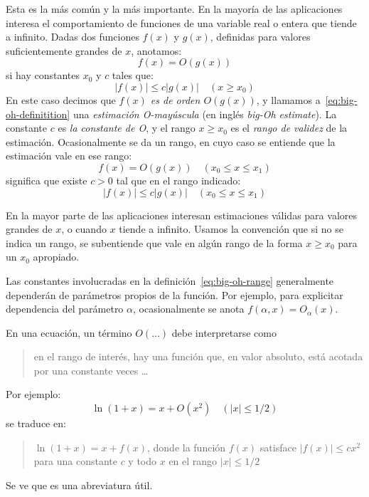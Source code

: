   Esta es la más común y la más importante.
  En la mayoría de las aplicaciones interesa
  el comportamiento de funciones de una variable real o entera
  que tiende a infinito.
  Dadas dos funciones \(f(x)\) y \(g(x)\),
  definidas para valores suficientemente grandes de \(x\),
  anotamos:
  \begin{equation}
    \label{eq:big-oh}
    f(x)
      = O(g(x))
  \end{equation}
  si hay constantes \(x_0\) y \(c\) tales que:
  \begin{equation}
    \label{eq:big-oh-definitition}
    \lvert f(x) \rvert
      \le c \lvert g(x) \rvert
      \quad (x \ge x_0)
  \end{equation}
  En este caso decimos que \emph{\(f(x)\) es de orden \(O(g(x))\)},
  y llamamos a~\eqref{eq:big-oh-definitition}
  una \emph{estimación O-mayúscula}
  (en inglés \emph{\foreignlanguage{english}{big-Oh estimate}}).
  La constante \(c\) es \emph{la constante de O},
  y el rango \(x \ge x_0\) es el \emph{rango de validez} de la estimación.
  Ocasionalmente se da un rango,
  en cuyo caso se entiende que la estimación vale en ese rango:
  \begin{equation*}
    f(x)
      = O(g(x))
      \quad (x_0 \le x \le x_1)
  \end{equation*}
  significa que existe \(c > 0\)
  tal que en el rango indicado:
  \begin{equation}
    \label{eq:big-oh-range}
    \lvert f(x) \rvert
      \le c \lvert g(x) \rvert
      \quad (x_0 \le x \le x_1)
  \end{equation}

  En la mayor parte de las aplicaciones interesan estimaciones válidas
  para valores grandes de \(x\),
  o cuando \(x\) tiende a infinito.
  Usamos la convención que si no se indica un rango,
  se subentiende que vale en algún rango de la forma \(x \ge x_0\)
  para un \(x_0\) apropiado.

  Las constantes involucradas en la definición~\eqref{eq:big-oh-range}
  generalmente dependerán de parámetros propios de la función.
  Por ejemplo,
  para explicitar dependencia del parámetro \(\alpha\),
  ocasionalmente se anota \(f(\alpha, x) = O_\alpha (x)\).

  En una ecuación,
  un término \(O(\ldots)\) debe interpretarse como
  \blockquote{en el rango de interés,
    hay una función que,
    en valor absoluto,
    está acotada por una constante veces \ldots}.
  Por ejemplo:
  \begin{equation*}
    \ln (1 + x)
      = x + O(x^2)
      \quad (\lvert x \rvert \le 1/2)
  \end{equation*}
  se traduce en:
  \blockquote{\(\ln (1 + x) = x + f(x)\),
    donde la función \(f(x)\) satisface \(\lvert f(x) \rvert \le c x^2\)
    para una constante \(c\)
    y todo \(x\) en el rango \(\lvert x \rvert \le 1/2\)}.
  Se ve que es una abreviatura útil.

